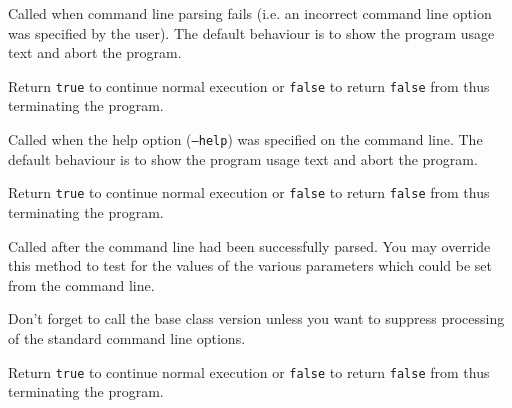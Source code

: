 


\label{wxapponcmdlineerror}


Called when command line parsing fails (i.e. an incorrect command line option
was specified by the user). The default behaviour is to show the program usage
text and abort the program.

Return {\tt true} to continue normal execution or {\tt false} to return 
{\tt false} from  thus terminating the program.




\label{wxapponcmdlinehelp}


Called when the help option ({\tt --help}) was specified on the command line.
The default behaviour is to show the program usage text and abort the program.

Return {\tt true} to continue normal execution or {\tt false} to return 
{\tt false} from  thus terminating the program.




\label{wxapponcmdlineparsed}


Called after the command line had been successfully parsed. You may override
this method to test for the values of the various parameters which could be
set from the command line.

Don't forget to call the base class version unless you want to suppress
processing of the standard command line options.

Return {\tt true} to continue normal execution or {\tt false} to return 
{\tt false} from  thus terminating the program.

